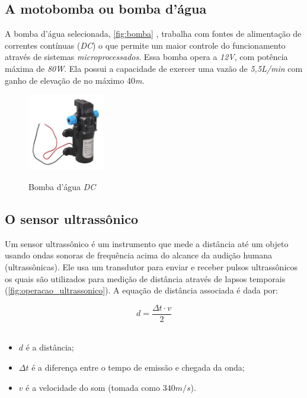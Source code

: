 \subsection{A motobomba ou bomba d'água}

A bomba d'água selecionada, \autoref{fig:bomba} , trabalha com fontes de alimentação de correntes contínuas (\textit{DC}) o que permite um maior controle do funcionamento através de sistemas \textit{microprocessados}. Essa bomba opera a \textit{12V}, com potência máxima de \textit{80W}. Ela possui a capacidade de exercer uma vazão de \textit{5,5L/min} com ganho de elevação de no máximo 40\textit{m}.

\begin{figure}[H]
	\centering
	\caption{Bomba d'água \textit{DC}}
	\includegraphics[width=0.3\textwidth]{figuras/bomba.jpeg}
	\label{fig:bomba}
\end{figure}

\subsection{O sensor ultrassônico}
\label{ssec:sensor_ultra}

Um sensor ultrassônico é um instrumento que mede a distância até um objeto usando ondas sonoras de frequência acima do alcance da audição humana (ultrassônicas). Ele usa um transdutor para enviar e receber pulsos ultrassônicos os quais são utilizados para medição de distância através de lapsos temporais (\autoref{fig:operacao_ultrassonico}). A equação de distância associada é dada por:

\begin{equation}
d = \frac{\Delta t \cdot v}{2}
\end{equation}
\\
\begin{itemize}
	
	\item $d$ é a distância;
	\item $\Delta t$ é a diferença entre o tempo de emissão e chegada da onda;
	\item  $v$ é a velocidade do som (tomada como $340m/s$). \\
\end{itemize}





